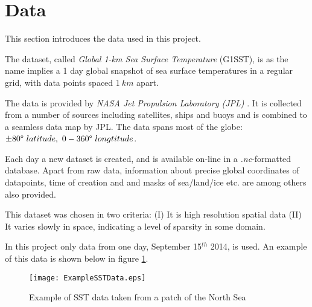\documentclass[Main]{subfiles}
\begin{document}
\section{Data} %
\label{sec:data}
	
	This section introduces the data used in this project.

	The dataset, called \emph{Global 1-km Sea Surface Temperature} (G1SST), is as the name implies a 1 day global snapshot of sea surface temperatures in a regular grid, with data points spaced $1\ km$ apart.

	The data is provided by \emph{NASA Jet Propulsion Laboratory (JPL)} \cite{G1SST:Online}.
	It is collected from a number of sources including satellites, ships and buoys and is combined to a seamless data map by JPL.
	The data spans most of the globe: $\pm 80\degree \ latitude,\ 0- 360\degree \ longtitude$.

	Each day a new dataset is created, and is available on-line in a \emph{.nc}-formatted database.
	Apart from raw data, information about precise global coordinates of datapoints, time of creation and and masks of sea/land/ice etc. are among others also provided.

	This dataset was chosen in two criteria: (I) It is high resolution spatial data (II) It varies slowly in space, indicating a level of sparsity in some domain.

	In this project only data from one day, September 15$^{th}$ 2014, is used. An example of this data is shown below in figure \ref{fig:ExampleSSTData}.
	

	\begin{figure}[H]
		\centering 
		\texttt{[image: ExampleSSTData.eps]}
		\caption{Example of SST data taken from a patch of the North Sea}
		\label{fig:ExampleSSTData}
	\end{figure}






\end{document}
